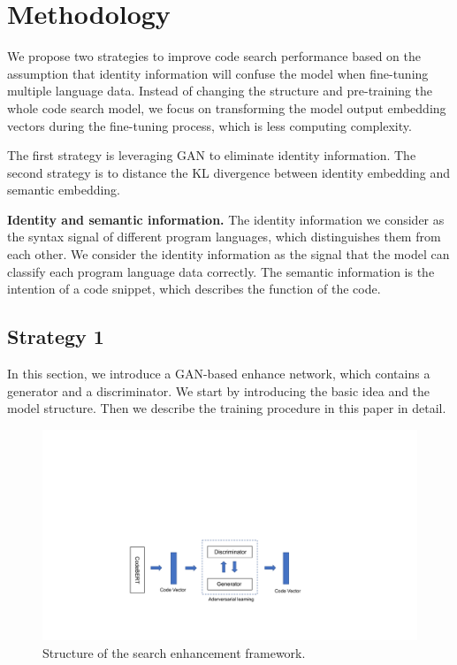 
\section{Methodology}

We propose two strategies to improve code search performance based on the assumption that identity information will confuse the model when fine-tuning multiple language data. Instead of changing the structure and pre-training the whole code search model, we focus on transforming the model output embedding vectors during the fine-tuning process, which is less computing complexity. 

The first strategy is leveraging GAN to eliminate identity information. The second strategy is to distance the KL divergence \cite{KL} between identity embedding and semantic embedding.

\noindent\textbf{Identity and semantic information.} The identity information we consider as the syntax signal of different program languages, which distinguishes them from each other. We consider the identity information as the signal that the model can classify each program language data correctly. The semantic information is the intention of a code snippet, which describes the function of the code.

\subsection{Strategy 1}

In this section, we introduce a GAN-based enhance network, 
which contains a generator and a discriminator. 
We start by introducing the basic idea and the model structure. 
Then we describe the training procedure in this paper in detail. 

\begin{figure}[htb]
	\centering
	\includegraphics[width=1\linewidth]{imgs/structure.pdf}
	\caption{Structure of the search enhancement framework.}
	\label{fig:structure}
\end{figure}

